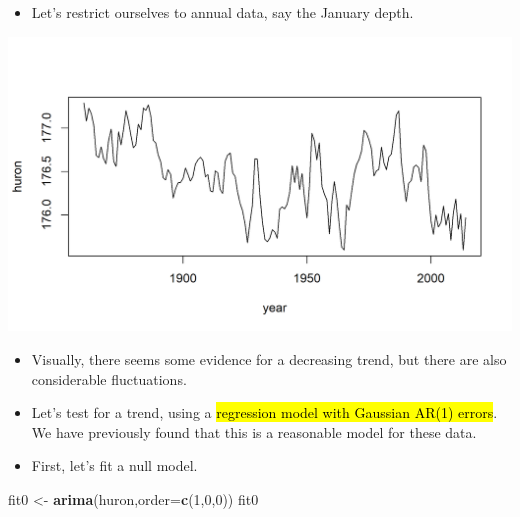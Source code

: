 \documentclass[]{article}
\newenvironment{Shaded}{\begin{snugshade}}{\end{snugshade}}
\newcommand{\KeywordTok}[1]{\textcolor[rgb]{0.13,0.29,0.53}{\textbf{#1}}}
\newcommand{\DataTypeTok}[1]{\textcolor[rgb]{0.13,0.29,0.53}{#1}}
\newcommand{\DecValTok}[1]{\textcolor[rgb]{0.00,0.00,0.81}{#1}}
\newcommand{\StringTok}[1]{\textcolor[rgb]{0.31,0.60,0.02}{#1}}
\newcommand{\OperatorTok}[1]{\textcolor[rgb]{0.81,0.36,0.00}{\textbf{#1}}}
\newcommand{\NormalTok}[1]{#1}
\providecommand{\tightlist}{%
  \setlength{\itemsep}{0pt}\setlength{\parskip}{0pt}}
\begin{document}
\begin{itemize}
\tightlist
\item
  Let's restrict ourselves to annual data, say the January depth.
\end{itemize}

\begin{Shaded}
\end{Shaded}

\begin{center}\includegraphics{figure/intro-data_subset-1} \end{center}

\begin{itemize}
\item
  Visually, there seems some evidence for a decreasing trend, but there
  are also considerable fluctuations.
\item
  Let's test for a trend, using a \hl{regression model with Gaussian AR(1)
  errors}. We have previously found that this is a reasonable model for
  these data.
\item
  First, let's fit a null model.
\end{itemize}

\begin{Shaded}
\begin{Highlighting}[]
\NormalTok{fit0 <-}\StringTok{ }\KeywordTok{arima}\NormalTok{(huron,}\DataTypeTok{order=}\KeywordTok{c}\NormalTok{(}\DecValTok{1}\NormalTok{,}\DecValTok{0}\NormalTok{,}\DecValTok{0}\NormalTok{))}
\NormalTok{fit0}
\end{Highlighting}
\end{Shaded}
\end{document}
